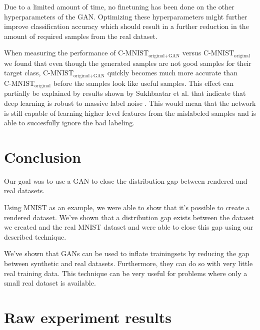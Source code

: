 \documentclass[10pt,twocolumn,letterpaper]{article}
\begin{document}
Due to a limited amount of time, no finetuning has been done on the other hyperparameters of the GAN. Optimizing these hyperparameters might further improve classification accuracy which should result in a further reduction in the amount of required samples from the real dataset.

When measuring the performance of $\text{C-MNIST}_\text{original+GAN}$ versus $\text{C-MNIST}_\text{original}$ we found that even though the generated samples are not good samples for their target class, $\text{C-MNIST}_\text{original+GAN}$ quickly becomes much more accurate than $\text{C-MNIST}_\text{original}$ before the samples look like useful samples. This effect can partially be explained by results shown by Sukhbaatar et al. that indicate that deep learning is robust to massive label noise \cite{Sukhbaatar2014TrainingCN}. This would mean that the network is still capable of learning higher level features from the mislabeled samples and is able to succesfully ignore the bad labeling.


\section{Conclusion}
Our goal was to use a GAN to close the distribution gap between rendered and real datasets. 

Using MNIST as an example, we were able to show that it's possible to create a rendered dataset. We've shown that a distribution gap exists between the dataset we created and the real MNIST dataset and were able to close this gap using our described technique.

We've shown that GANs can be used to inflate trainingsets by reducing the gap between synthetic and real datasets. Furthermore, they can do so with very little real training data. This technique can be very useful for problems where only a small real dataset is available.

{\small


}

\onecolumn
\appendix

\section{Raw experiment results}
\begin{longtable}{ | l | l | l | l | l | l | l | }
	\hline
	
\end{longtable}
\end{document}
